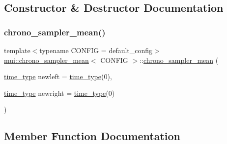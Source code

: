 \subsection{Constructor \& Destructor Documentation}
\mbox{\label{classmui_1_1chrono__sampler__mean_a4dba4a01f178d5197b97f0148d4b83d4}} 
\subsubsection{\texorpdfstring{chrono\+\_\+sampler\+\_\+mean()}{chrono\_sampler\_mean()}}
{\footnotesize\ttfamily template$<$typename C\+O\+N\+F\+IG  = default\+\_\+config$>$ \\
\hyperlink{classmui_1_1chrono__sampler__mean}{mui\+::chrono\+\_\+sampler\+\_\+mean}$<$ C\+O\+N\+F\+IG $>$\+::\hyperlink{classmui_1_1chrono__sampler__mean}{chrono\+\_\+sampler\+\_\+mean} (\begin{DoxyParamCaption}\item[{\hyperlink{classmui_1_1chrono__sampler__mean_aa818a9c8850aa9fda611430c158a0072}{time\+\_\+type}}]{newleft = {\ttfamily \hyperlink{classmui_1_1chrono__sampler__mean_aa818a9c8850aa9fda611430c158a0072}{time\+\_\+type}(0)},  }\item[{\hyperlink{classmui_1_1chrono__sampler__mean_aa818a9c8850aa9fda611430c158a0072}{time\+\_\+type}}]{newright = {\ttfamily \hyperlink{classmui_1_1chrono__sampler__mean_aa818a9c8850aa9fda611430c158a0072}{time\+\_\+type}(0)} }\end{DoxyParamCaption})\hspace{0.3cm}{\ttfamily [inline]}}



\subsection{Member Function Documentation}
\mbox{\label{classmui_1_1chrono__sampler__mean_af98f70be1855c6fc48309ced44400dbe}} 
